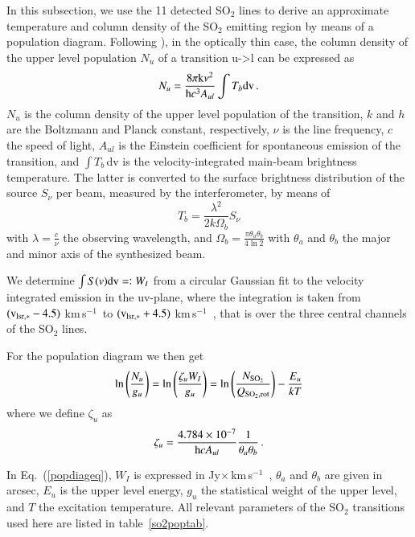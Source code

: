 \documentclass{aa}
\newcommand{\kms}{\,km\,s$^{-1}$~}
\begin{document}
In this subsection, we use the 11 detected SO$_2$ lines to derive an
approximate temperature and column density of the SO$_2$ emitting
region by means of a population diagram.  Following \citet{gl99}), in
the optically thin case,  the column density of the upper level
population $N_u$ of a transition u->l can be expressed as
\begin{equation}
N_u = \frac{8 \pi \rm{k} \nu ^2}{{\rm h} c^3 A_{ul}}  \int T_b {\rm dv} \, .
\end{equation}
$N_u$ is the column density of the upper level population of the
transition, $k$ and $h$ are the Boltzmann and Planck constant,
respectively, $\nu$ is the line frequency, $c$ the speed of light,
$A_{ul}$ is the Einstein coefficient for spontaneous emission of the
transition, and $\int T_b$\,dv is the velocity-integrated main-beam
brightness temperature.  The latter is converted to the surface
brightness distribution of the source $S_\nu$ per beam,  measured by
the interferometer, by means of 
\begin{equation}
T_b = \frac{\lambda^2}{2k\Omega_b} S_\nu
\end{equation}
with $\lambda = \frac{c}{\nu}$ the observing wavelength, and $\Omega_b
=\frac{\pi \theta_a \theta_b}{4 \ln 2}$ with $\theta_a$ and $\theta_b$
the major and minor axis of the synthesized beam.

We determine $\int S(v) {\rm dv} =\vcentcolon W_I$ from a circular
Gaussian fit to the velocity integrated emission in the uv-plane,
where the integration is taken from $({\rm v_{lsr,*}-4.5})$\,\kms to
$({\rm v_{\rm lsr,*}+4.5})$\,\kms, that is over the three central
channels of the  SO$_2$ lines. 

For the population diagram we then get
\begin{equation}
\ln \left(\frac{N_u}{g_u} \right)          = 
\ln \left( \frac{\zeta_u W_I}{g_u} \right) = 
\ln \left( \frac{N_{\rm SO_2}}{Q_{\rm SO_2,rot}} \right) - \frac{E_u}{kT}
\label{popdiageq}
\end{equation}
where we define $\zeta_u$ as
\begin{equation}
\zeta_u = \frac{4.784 \times 10^{-7}}{{\rm h} c A_{ul}}
\frac{1}{\theta_a \theta_b} \, .
\label{zetaeq}
\end{equation}

In Eq.~(\ref{popdiageq}), $W_I$ is expressed in Jy$\times$\kms,
$\theta_a$ and $\theta_b$ are given in arcsec, $E_u$ is the upper
level energy, $g_u$ the statistical weight of the upper level,  and
$T$ the excitation temperature. All relevant parameters of the SO$_2$
transitions used here are listed in table~\ref{so2poptab}.
\end{document}
